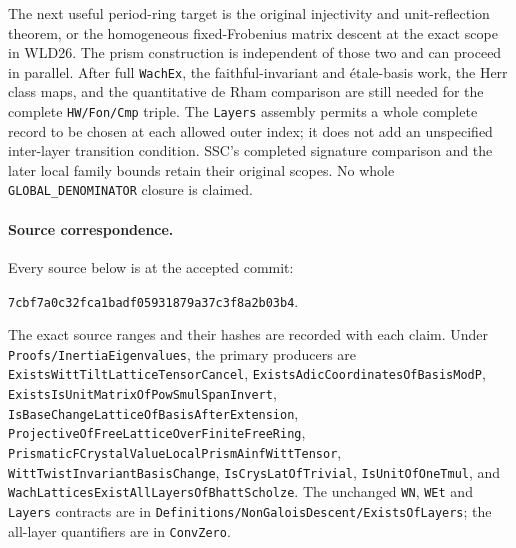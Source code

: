 \documentclass[11pt,a4paper]{article}
\numberwithin{equation}{section}
\theoremstyle{remark}\newtheorem{remark}[theorem]{Remark}
\begin{document}
The next useful period-ring target is the original injectivity and
unit-reflection theorem, or the homogeneous fixed-Frobenius matrix
descent at the exact scope in WLD26. The prism construction is
independent of those two and can proceed in parallel. After full
\texttt{Wach\allowbreak Ex}, the faithful-invariant and \'etale-basis work,
the Herr class maps, and the quantitative de Rham comparison are
still needed for the complete \texttt{HW/\allowbreak Fon/\allowbreak Cmp} triple.
The \texttt{Layers} assembly permits a whole complete record to be
chosen at each allowed outer index; it does not add an unspecified
inter-layer transition condition. SSC's completed signature comparison
and the later local family bounds retain their original scopes.
No whole \texttt{GLOBAL\_\allowbreak DENOMINATOR} closure is claimed.

\paragraph{Source correspondence.}
Every source below is at the accepted commit:
\par\noindent\texttt{7cbf7a0c32fca1badf05931879a37c3f8a2b03b4}.
\par\noindent
The exact source ranges and their hashes are recorded with each claim.
Under \texttt{Proofs/\allowbreak Inertia\allowbreak Eigenvalues}, the primary producers are
\texttt{Exists\allowbreak Witt\allowbreak Tilt\allowbreak Lattice\allowbreak Tensor\allowbreak Cancel},
\texttt{Exists\allowbreak Adic\allowbreak Coordinates\allowbreak Of\allowbreak Basis\allowbreak Mod\allowbreak P},
\texttt{Exists\allowbreak Is\allowbreak Unit\allowbreak Matrix\allowbreak Of\allowbreak Pow\allowbreak Smul\allowbreak Span\allowbreak Invert},
\texttt{Is\allowbreak Base\allowbreak Change\allowbreak Lattice\allowbreak Of\allowbreak Basis\allowbreak After\allowbreak Extension},
\texttt{Projective\allowbreak Of\allowbreak Free\allowbreak Lattice\allowbreak Over\allowbreak Finite\allowbreak Free\allowbreak Ring},
\texttt{Prismatic\allowbreak FCrystal\allowbreak Value\allowbreak Local\allowbreak Prism\allowbreak Ainf\allowbreak Witt\allowbreak Tensor},
\texttt{Witt\allowbreak Twist\allowbreak Invariant\allowbreak Basis\allowbreak Change},
\texttt{Is\allowbreak Crys\allowbreak Lat\allowbreak Of\allowbreak Trivial}, \texttt{Is\allowbreak Unit\allowbreak Of\allowbreak One\allowbreak Tmul}, and
\texttt{Wach\allowbreak Lattices\allowbreak Exist\allowbreak All\allowbreak Layers\allowbreak Of\allowbreak Bhatt\allowbreak Scholze}.
The unchanged \texttt{WN}, \texttt{WEt} and \texttt{Layers}
contracts are in \texttt{Definitions/\allowbreak Non\allowbreak Galois\allowbreak Descent/\allowbreak Exists\allowbreak Of\allowbreak Layers};
the all-layer quantifiers are in \texttt{Conv\allowbreak Zero}.






\endgroup
\end{document}
